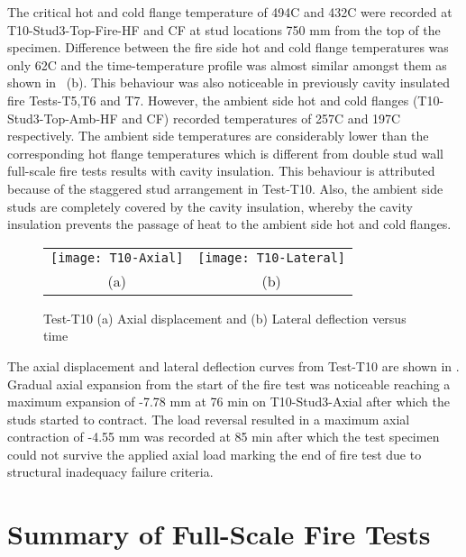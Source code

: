 The critical hot and cold flange temperature of 494\degree C and 432\degree C were recorded at T10-Stud3-Top-Fire-HF and CF at stud locations 750 mm from the top of the specimen. Difference between the fire side hot and cold flange temperatures was only 62\degree C and the time-temperature profile was almost similar amongst them as shown in ~(b). This behaviour was also noticeable in previously cavity insulated fire Tests-T5,T6 and T7. However, the ambient side hot and cold flanges (T10-Stud3-Top-Amb-HF and CF) recorded temperatures of 257\degree C and 197\degree C respectively. The ambient side temperatures are considerably lower than the corresponding hot flange temperatures which is different from double stud wall full-scale fire tests results with cavity insulation. This behaviour is attributed because of the staggered stud arrangement in Test-T10. Also, the ambient side studs are completely covered by the cavity insulation, whereby the cavity insulation prevents the passage of heat to the ambient side hot and cold flanges.   
\begin{figure}[!htbp]
	\centering
		\begin{tabular}{cc}
			\texttt{[image: T10-Axial]} & \texttt{[image: T10-Lateral]} \\ 
			(a) & (b) \\ 
		\end{tabular} 
		\caption{Test-T10 (a) Axial displacement and (b) Lateral deflection versus time}
		\label{fig:T10-displacement}
\end{figure}

The axial displacement and lateral deflection curves from Test-T10 are shown in . Gradual axial expansion from the start of the fire test was noticeable reaching a maximum expansion of -7.78 mm at 76 min on T10-Stud3-Axial after which the studs started to contract. The load reversal resulted in a maximum axial contraction of -4.55 mm was recorded at 85 min after which the test specimen could not survive the applied axial load marking the end of fire test due to structural inadequacy failure criteria.

\section{Summary of Full-Scale Fire Tests}

